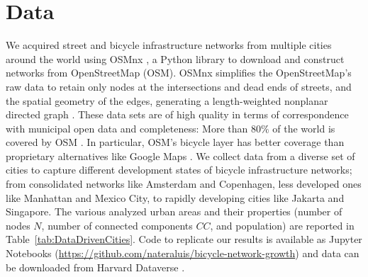 \section{Data}
We acquired street and bicycle infrastructure networks from multiple cities around the world using OSMnx \cite{Boeing2017OSMNX}, a Python library to download and construct networks from OpenStreetMap (OSM). OSMnx simplifies the OpenStreetMap's raw data to retain only nodes at the intersections and dead ends of streets, and the spatial geometry of the edges, generating a length-weighted nonplanar directed graph \cite{Boeing2020Planarity}. These data sets are of high quality \cite{Haklay2010OpenStreetMap,Girres2010Quality} in terms of correspondence with municipal open data \cite{Ferster2019Bicycle} and completeness: More than $80\%$ of the world is covered by OSM \cite{Barbosa-Filho2017Models}. In particular, OSM's bicycle layer has better coverage than proprietary alternatives like Google Maps \cite{Hochmair2012}. We collect data from a diverse set of cities to capture different development states of bicycle infrastructure networks; from consolidated networks like Amsterdam and Copenhagen, less developed ones like Manhattan and Mexico City, to rapidly developing cities like Jakarta and Singapore. The various analyzed urban areas and their properties (number of nodes $N$, number of connected components $CC$, and population) are reported in Table~\ref{tab:DataDrivenCities}. Code to replicate our results is available as Jupyter Notebooks (\url{https://github.com/nateraluis/bicycle-network-growth}) and data can be downloaded from Harvard Dataverse \cite{natera2019data}.

